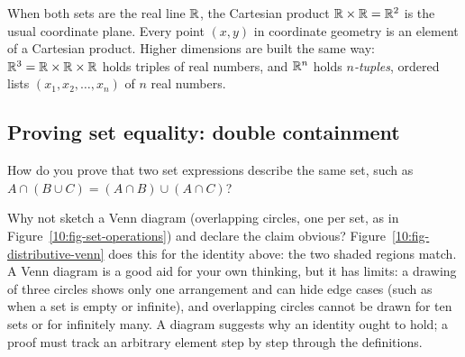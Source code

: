 When both sets are the real line $\mathbb{R}$, the Cartesian product $\mathbb{R} \times \mathbb{R} = \mathbb{R}^2$ is the usual coordinate plane. Every point $(x, y)$ in coordinate geometry is an element of a Cartesian product. Higher dimensions are built the same way: $\mathbb{R}^3 = \mathbb{R} \times \mathbb{R} \times \mathbb{R}$ holds triples of real numbers, and $\mathbb{R}^n$ holds \emph{$n$-tuples}, ordered lists $(x_1, x_2, \dots, x_n)$ of $n$ real numbers.

\subsection{Proving set equality: double containment}

How do you prove that two set expressions describe the same set, such as $A \cap (B \cup C) = (A \cap B) \cup (A \cap C)$?

Why not sketch a Venn diagram (overlapping circles, one per set, as in Figure~\ref{10:fig-set-operations}) and declare the claim obvious? Figure~\ref{10:fig-distributive-venn} does this for the identity above: the two shaded regions match. A Venn diagram is a good aid for your own thinking, but it has limits: a drawing of three circles shows only one arrangement and can hide edge cases (such as when a set is empty or infinite), and overlapping circles cannot be drawn for ten sets or for infinitely many. A diagram suggests why an identity ought to hold; a proof must track an arbitrary element step by step through the definitions.

